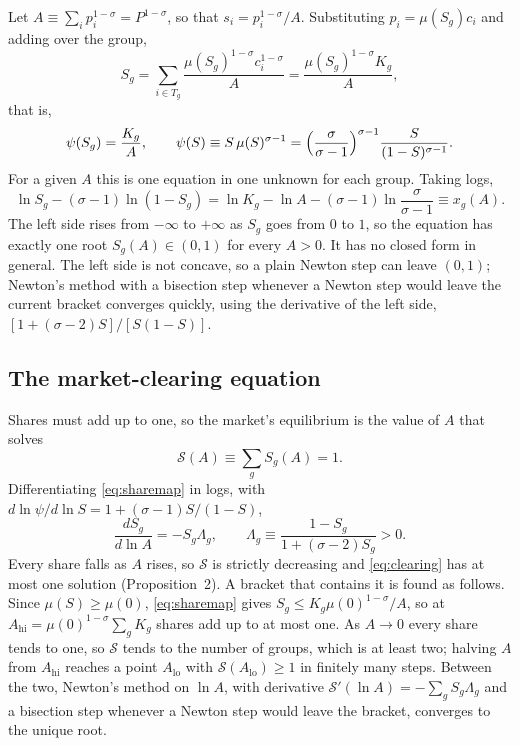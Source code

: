 \documentclass[11pt]{article}
\begin{document}
Let $A\equiv\sum_ip_i^{1-\sigma}=P^{1-\sigma}$, so that $s_i=p_i^{1-\sigma}/A$.
Substituting $p_i=\mu(S_g)c_i$ and adding over the group,
\[
  S_g=\sum_{i\in T_g}\frac{\mu(S_g)^{1-\sigma}c_i^{1-\sigma}}{A}
  =\frac{\mu(S_g)^{1-\sigma}K_g}{A},
\]
that is,
\begin{equation}
  \psi(S_g)=\frac{K_g}{A},
  \qquad
  \psi(S)\equiv S\,\mu(S)^{\sigma-1}
  =\Bigl(\frac{\sigma}{\sigma-1}\Bigr)^{\sigma-1}\frac{S}{(1-S)^{\sigma-1}} .
  \label{eq:sharemap}
\end{equation}
For a given $A$ this is one equation in one unknown for each group. Taking logs,
\begin{equation}
  \ln S_g-(\sigma-1)\ln(1-S_g)=\ln K_g-\ln A-(\sigma-1)\ln\frac{\sigma}{\sigma-1}
  \equiv x_g(A).
  \label{eq:shareeq}
\end{equation}
The left side rises from $-\infty$ to $+\infty$ as $S_g$ goes from $0$ to $1$, so the
equation has exactly one root $S_g(A)\in(0,1)$ for every $A>0$. It has no closed form in
general. The left side is not concave, so a plain Newton step can leave $(0,1)$;
Newton's method with a bisection step whenever a Newton step would leave the current
bracket converges quickly, using the derivative of the left side,
$[1+(\sigma-2)S]/[S(1-S)]$.

\subsection{The market-clearing equation}

Shares must add up to one, so the market's equilibrium is the value of $A$ that
solves
\begin{equation}
  \mathcal S(A)\equiv\sum_gS_g(A)=1 .
  \label{eq:clearing}
\end{equation}
Differentiating \eqref{eq:sharemap} in logs, with
$d\ln\psi/d\ln S=1+(\sigma-1)S/(1-S)$,
\begin{equation}
  \frac{dS_g}{d\ln A}=-S_g\Lambda_g,
  \qquad
  \Lambda_g\equiv\frac{1-S_g}{1+(\sigma-2)S_g}>0 .
  \label{eq:dSdA}
\end{equation}
Every share falls as $A$ rises, so $\mathcal S$ is strictly decreasing and
\eqref{eq:clearing} has at most one solution (Proposition~2). A bracket that contains it
is found as follows. Since $\mu(S)\ge\mu(0)$, \eqref{eq:sharemap} gives
$S_g\le K_g\mu(0)^{1-\sigma}/A$, so at $A_{\mathrm{hi}}=\mu(0)^{1-\sigma}\sum_gK_g$ shares
add up to at most one. As $A\to0$ every share tends to one, so $\mathcal S$ tends to the
number of groups, which is at least two; halving $A$ from $A_{\mathrm{hi}}$ reaches a
point $A_{\mathrm{lo}}$ with $\mathcal S(A_{\mathrm{lo}})\ge1$ in finitely many steps.
Between the two, Newton's method on $\ln A$, with derivative
$\mathcal S'(\ln A)=-\sum_gS_g\Lambda_g$ and a bisection step whenever a Newton step
would leave the bracket, converges to the unique root.
\end{document}
